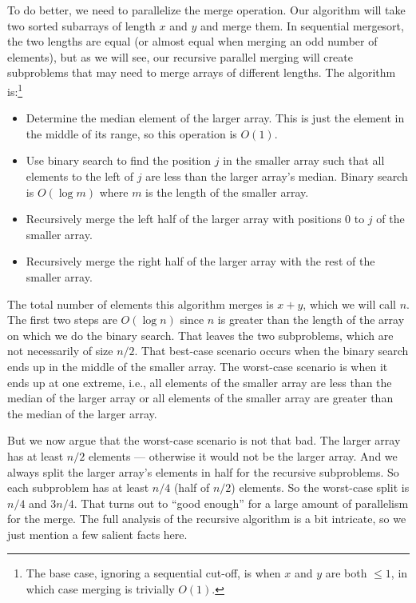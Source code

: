 \documentclass[10pt]{article}
\begin{document}
To do better, we need to parallelize the merge operation.  Our
algorithm will take two sorted subarrays of length $x$ and $y$ and
merge them.  In sequential mergesort, the two lengths are equal
(or almost equal when merging an odd number of elements), but as we will see, our recursive parallel merging
will create subproblems that may need to merge arrays of different
lengths.  The algorithm is:\footnote{The base case, ignoring a
  sequential cut-off, is when $x$ and $y$ are both $\leq 1$, in which
  case merging is trivially $O(1)$.}
\begin{itemize}
\item Determine the median element of the larger array.  This is
  just the element in the middle of its range, so this operation is
  $O(1)$.  
\item Use binary search to find the position $j$ in the smaller array
  such that all elements to the left of $j$ are less than the larger
  array's median.  Binary search is $O(\log m)$ where $m$ is the
  length of the smaller array.
\item Recursively merge the left half of the larger array with
  positions $0$ to $j$ of the smaller array.
\item Recursively merge the right half of the larger array with
  the rest of the smaller array.  
\end{itemize}
The total number of elements this algorithm merges is $x+y$, which we
will call $n$.  The first two steps are $O(\log n)$ since $n$ is
greater than the length of the array on which we do the binary
search.  That leaves the two subproblems, which are not necessarily of
size $n/2$.  That best-case scenario occurs when the binary search
ends up in the middle of the smaller array.  The worst-case scenario
is when it ends up at one extreme, i.e., all elements of the smaller
array are less than the median of the larger array or all elements of
the smaller array are greater than the median of the larger array.

But we now argue that the worst-case scenario is not that bad.  The
larger array has at least $n/2$ elements --- otherwise it would not be
the larger array.  And we always split the larger array's elements in
half for the recursive subproblems.  So each subproblem has at least
$n/4$ (half of $n/2$) elements.  So the worst-case split is $n/4$ and
$3n/4$.  That turns out to ``good enough'' for a large amount of
parallelism for the merge.  The full analysis of the recursive
algorithm is a bit intricate, so we just mention a few salient facts here.
\end{document}
